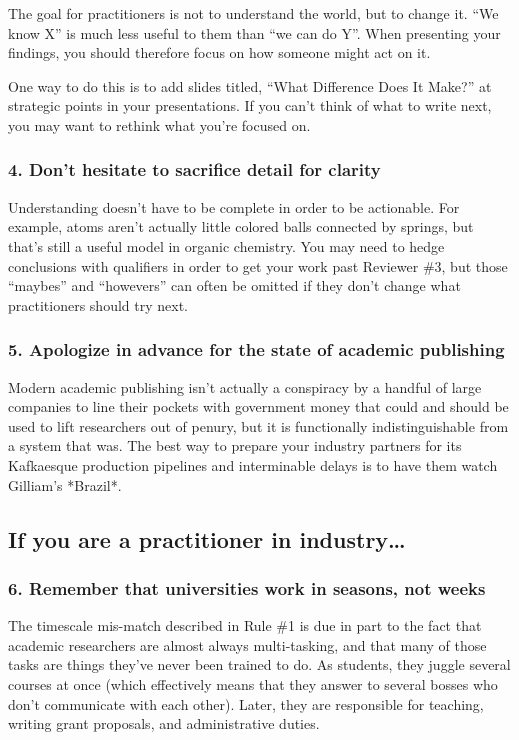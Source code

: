 \documentclass[10pt,letterpaper]{article}
\begin{document}
The goal for practitioners is not to understand the world, but to change it. ``We
know X'' is much less useful to them than ``we can do Y''. When presenting your
findings, you should therefore focus on how someone might act on it.

One way to do this is to add slides titled, ``What Difference Does It Make?'' at
strategic points in your presentations. If you can't think of what to write
next, you may want to rethink what you're focused on.

\subsubsection*{4. Don't hesitate to sacrifice detail for clarity}

Understanding doesn't have to be complete in order to be actionable. For
example, atoms aren't actually little colored balls connected by springs, but
that's still a useful model in organic chemistry. You may need to hedge
conclusions with qualifiers in order to get your work past Reviewer \#3, but
those ``maybes'' and ``howevers'' can often be omitted if they don't change what
practitioners should try next.

\subsubsection*{5. Apologize in advance for the state of academic publishing}

Modern academic publishing isn't actually a conspiracy by a handful of large
companies to line their pockets with government money that could and should be
used to lift researchers out of penury, but it is functionally indistinguishable
from a system that was. The best way to prepare your industry partners for its
Kafkaesque production pipelines and interminable delays is to have them watch
Gilliam's *Brazil*.

\subsection*{If you are a practitioner in industry{\ldots}}

\subsubsection*{6. Remember that universities work in seasons, not weeks}

The timescale mis-match described in Rule \#1 is due in part to the fact that
academic researchers are almost always multi-tasking, and that many of those
tasks are things they've never been trained to do. As students, they juggle
several courses at once (which effectively means that they answer to several
bosses who don't communicate with each other). Later, they are responsible for
teaching, writing grant proposals, and administrative duties.
\end{document}
